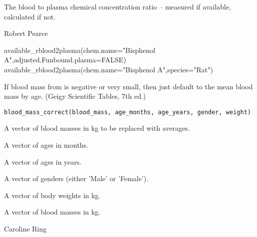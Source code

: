 \documentclass[a4paper]{book}
\begin{document}
%
\begin{Value}
The blood to plasma chemical concentration ratio -- measured if available,
calculated if not.
\end{Value}
%
\begin{Author}\relax
Robert Pearce
\end{Author}
%
\begin{Examples}
\begin{ExampleCode}

available_rblood2plasma(chem.name="Bisphenol A",adjusted.Funbound.plasma=FALSE)
available_rblood2plasma(chem.name="Bisphenol A",species="Rat")

\end{ExampleCode}
\end{Examples}
%
\begin{Description}\relax
If blood mass from  is negative or very small,
then just default to the mean blood mass by age. (Geigy Scientific Tables,
7th ed.)
\end{Description}
%
\begin{Usage}
\begin{verbatim}
blood_mass_correct(blood_mass, age_months, age_years, gender, weight)
\end{verbatim}
\end{Usage}
%
\begin{Arguments}
\begin{ldescription}
\item[\code{blood\_mass}] A vector of blood masses in kg to be replaced with
averages.

\item[\code{age\_months}] A vector of ages in months.

\item[\code{age\_years}] A vector of ages in years.

\item[\code{gender}] A vector of genders (either 'Male' or 'Female').

\item[\code{weight}] A vector of body weights in kg.
\end{ldescription}
\end{Arguments}
%
\begin{Value}
A vector of blood masses in kg.
\end{Value}
%
\begin{Author}\relax
Caroline Ring
\end{Author}
\end{document}
